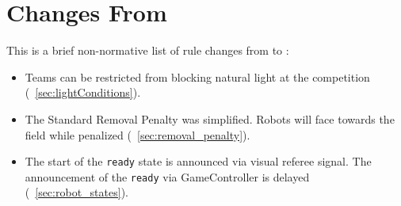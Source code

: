 \section{Changes From \LastRCYear}

This is a brief non-normative list of rule changes from \LastRCYear to \RCYear:
\begin{itemize}
  \item Teams can be restricted from blocking natural light at the competition (\cf~\cref{sec:lightConditions}).
  \item The Standard Removal Penalty was simplified. Robots will face towards the field while penalized (\cf~\cref{sec:removal_penalty}).
  \item The start of the \texttt{ready} state is announced via visual referee signal. The announcement of the \texttt{ready} via GameController is delayed (\cf~\cref{sec:robot_states}).

\end{itemize}
